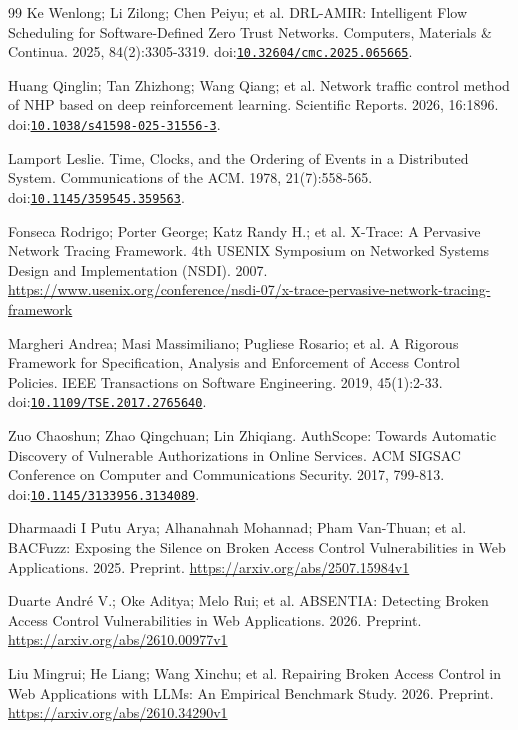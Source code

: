 \begin{thebibliography}{99}
Ke Wenlong; Li Zilong; Chen Peiyu; et al. DRL-AMIR: Intelligent Flow Scheduling for Software-Defined Zero Trust Networks. Computers, Materials \& Continua. 2025, 84(2):3305-3319. doi:\href{https://doi.org/10.32604/cmc.2025.065665}{\nolinkurl{10.32604/cmc.2025.065665}}.

Huang Qinglin; Tan Zhizhong; Wang Qiang; et al. Network traffic control method of NHP based on deep reinforcement learning. Scientific Reports. 2026, 16:1896. doi:\href{https://doi.org/10.1038/s41598-025-31556-3}{\nolinkurl{10.1038/s41598-025-31556-3}}.

Lamport Leslie. Time, Clocks, and the Ordering of Events in a Distributed System. Communications of the ACM. 1978, 21(7):558-565. doi:\href{https://doi.org/10.1145/359545.359563}{\nolinkurl{10.1145/359545.359563}}.

Fonseca Rodrigo; Porter George; Katz Randy H.; et al. X-Trace: A Pervasive Network Tracing Framework. 4th USENIX Symposium on Networked Systems Design and Implementation (NSDI). 2007. \url{https://www.usenix.org/conference/nsdi-07/x-trace-pervasive-network-tracing-framework}

Margheri Andrea; Masi Massimiliano; Pugliese Rosario; et al. A Rigorous Framework for Specification, Analysis and Enforcement of Access Control Policies. IEEE Transactions on Software Engineering. 2019, 45(1):2-33. doi:\href{https://doi.org/10.1109/TSE.2017.2765640}{\nolinkurl{10.1109/TSE.2017.2765640}}.

Zuo Chaoshun; Zhao Qingchuan; Lin Zhiqiang. AuthScope: Towards Automatic Discovery of Vulnerable Authorizations in Online Services. ACM SIGSAC Conference on Computer and Communications Security. 2017, 799-813. doi:\href{https://doi.org/10.1145/3133956.3134089}{\nolinkurl{10.1145/3133956.3134089}}.

Dharmaadi I Putu Arya; Alhanahnah Mohannad; Pham Van-Thuan; et al. BACFuzz: Exposing the Silence on Broken Access Control Vulnerabilities in Web Applications. 2025. Preprint. \url{https://arxiv.org/abs/2507.15984v1}

Duarte André V.; Oke Aditya; Melo Rui; et al. ABSENTIA: Detecting Broken Access Control Vulnerabilities in Web Applications. 2026. Preprint. \url{https://arxiv.org/abs/2610.00977v1}

Liu Mingrui; He Liang; Wang Xinchu; et al. Repairing Broken Access Control in Web Applications with LLMs: An Empirical Benchmark Study. 2026. Preprint. \url{https://arxiv.org/abs/2610.34290v1}


\end{thebibliography}

